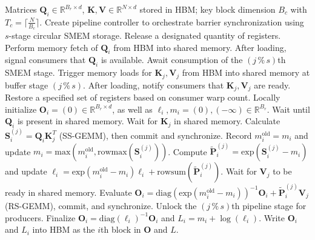 \begin{enumerate}
\begin{algorithm}[H]
    \caption{\small\label{alg:flash3_wgmma_ws_only}\textsc{FlashAttention-3} forward pass \textbf{excluding} intra-consumer overlap -- CTA perspective}
    \begin{algorithmic}[1]
\REQUIRE Matrices $\mathbf{Q}_i \in \mathbb{R}^{B_r \times d}$, $\mathbf{K}, \mathbf{V} \in \mathbb{R}^{N \times d}$ stored in HBM; key block dimension $B_c$ with $T_c = \lceil \frac{N}{B_c} \rceil$.
\STATE Create pipeline controller to orchestrate barrier synchronization using $s$-stage circular SMEM storage.
\STATE Release a designated quantity of registers.
\STATE Perform memory fetch of $\mathbf{Q}_i$ from HBM into shared memory.
\STATE After loading, signal consumers that $\mathbf{Q}_i$ is available.
    \STATE Await consumption of the $(j\,\%\,s)$th SMEM stage.
    \STATE Trigger memory loads for $\mathbf{K}_j, \mathbf{V}_j$ from HBM into shared memory at buffer stage $(j\,\%\,s)$.
    \STATE After loading, notify consumers that $\mathbf{K}_j, \mathbf{V}_j$ are ready.
\ENDFOR
\ELSE \STATE Restore a specified set of registers based on consumer warp count.
\STATE Locally initialize $\mathbf{O}_i = (0) \in \mathbb{R}^{B_r \times d}$, as well as $\ell_i, m_i = (0), (-\infty) \in \mathbb{R}^{B_r}$.
\STATE Wait until $\mathbf{Q}_i$ is present in shared memory.
\STATE Wait for $\mathbf{K}_j$ in shared memory.
\STATE Calculate $\mathbf{S}_i^{(j)} = \mathbf{Q}_i \mathbf{K}_j^T$ (SS-GEMM), then commit and synchronize. \label{alg:ws_only_gemm1}
\STATE Record $m_i^{\mathrm{old}} = m_i$ and update $m_i = \mathrm{max}(m_i^{\mathrm{old}}, \mathrm{rowmax}(\mathbf{S}_i^{(j)}))$. \label{code-ws:softmax_start}
\STATE Compute $\widetilde{\mathbf{P}}_i^{(j)} = \mathrm{exp}(\mathbf{S}_i^{(j)} - m_i)$ and update $\ell_i = \mathrm{exp}(m_i^{\mathrm{old}} - m_i) \ell_i + \mathrm{rowsum}(\widetilde{\mathbf{P}}_i^{(j)})$. \label{code-ws:softmax_end}
\STATE Wait for $\mathbf{V}_j$ to be ready in shared memory.
\STATE Evaluate $\mathbf{O}_i = \mathrm{diag}(\mathrm{exp}(m_i^{\mathrm{old}} - m_i))^{-1} \mathbf{O}_i + \widetilde{\mathbf{P}}_i^{(j)} \mathbf{V}_j$ (RS-GEMM), commit, and synchronize. \label{alg:ws_only_gemm2}
\STATE Unlock the $(j\,\%\,s)$th pipeline stage for producers.
\ENDFOR
\STATE Finalize $\mathbf{O}_i = \mathrm{diag}(\ell_i)^{-1} \mathbf{O}_i$ and $L_i = m_i + \log(\ell_i)$.
\STATE Write $\mathbf{O}_i$ and $L_i$ into HBM as the $i$th block in $\mathbf{O}$ and $L$.
\ENDIF
\end{algorithmic}
\end{algorithm}


\end{enumerate}
